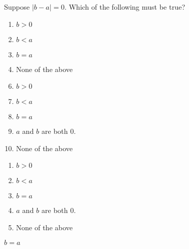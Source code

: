 




  Suppose $|b-a|=0$.  Which of the following must be true?



\ifsat
	\begin{enumerate}[label=\Alph*)]
		\item   $b>0$
		\item  $b<a$
		\item  $b=a$ %
		\item  None of the above
	\end{enumerate}
\else
\fi

\ifacteven
	\begin{enumerate}[label=\textbf{\Alph*.},itemsep=\fill,align=left]
		\setcounter{enumii}{5}
		\item   $b>0$
		\item  $b<a$
		\item  $b=a$ %
		\addtocounter{enumii}{1}
		\item   $a$ and $b$ are both 0.
		\item  None of the above
	\end{enumerate}
\else
\fi

\ifactodd
	\begin{enumerate}[label=\textbf{\Alph*.},itemsep=\fill,align=left]
		\item   $b>0$
		\item  $b<a$
		\item  $b=a$ %
		\item   $a$ and $b$ are both 0.
		\item  None of the above
	\end{enumerate}
\else
\fi

\ifgridin
  $b=a$ %
		
\else
\fi

